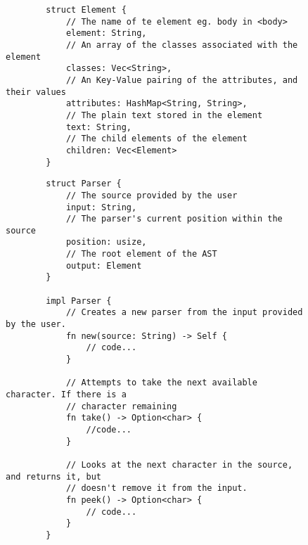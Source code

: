 \begin{figure}
	\begin{verbatim}
		struct Element {
		    // The name of te element eg. body in <body>
			element: String,
			// An array of the classes associated with the element
			classes: Vec<String>,
			// An Key-Value pairing of the attributes, and their values
			attributes: HashMap<String, String>,
			// The plain text stored in the element
			text: String,
			// The child elements of the element
			children: Vec<Element>
		}
	\end{verbatim}
\end{figure}

\begin{figure}
	\begin{verbatim}
		struct Parser {
			// The source provided by the user
			input: String,
			// The parser's current position within the source
			position: usize,
			// The root element of the AST
			output: Element
		}

		impl Parser {
			// Creates a new parser from the input provided by the user.
			fn new(source: String) -> Self {
				// code...
			}

			// Attempts to take the next available character. If there is a
			// character remaining 
			fn take() -> Option<char> {
				//code...
			}

			// Looks at the next character in the source, and returns it, but
			// doesn't remove it from the input.
			fn peek() -> Option<char> {
				// code...
			}
		}
	\end{verbatim}

\end{figure}